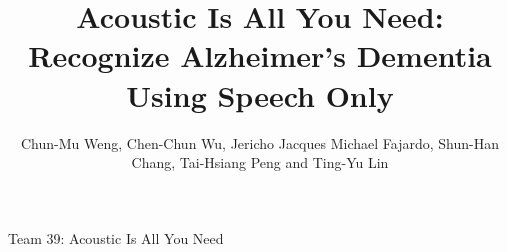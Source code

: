 \documentclass[journal]{IEEEtran}
\begin{document}
%
\title{Acoustic Is All You Need: Recognize Alzheimer's Dementia Using Speech Only}

\author{Chun-Mu Weng, Chen-Chun Wu, Jericho Jacques Michael Fajardo, Shun-Han Chang, Tai-Hsiang Peng and Ting-Yu Lin}


% 


%
{Team 39: Acoustic Is All You Need}
% 
\end{document}
